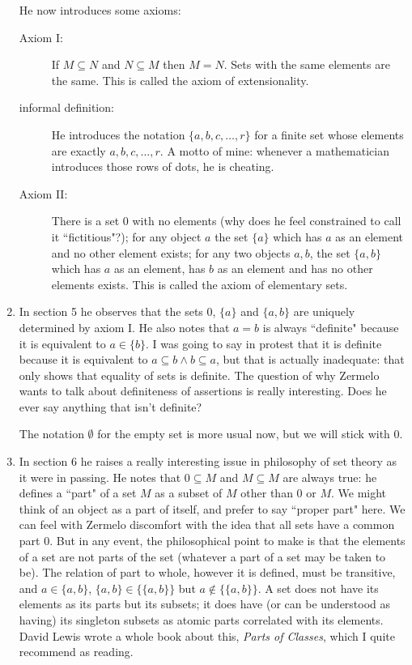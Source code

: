 \documentclass[12pt]{article}
\begin{document}
\begin{enumerate}
He now introduces some axioms:

\begin{description}

\item[Axiom I:]  If $M \subseteq N$ and $N \subseteq M$ then $M=N$.  Sets with the same elements are the same.  This is called the axiom of extensionality.

\item[informal definition:]  He introduces the notation $\{a,b,c,\ldots,r\}$ for a finite set whose elements are exactly $a,b,c,\ldots,r$.  A motto of mine:  whenever a mathematician introduces those rows of dots, he is cheating.

\item[Axiom II:]  There is a set 0 with no elements (why does he feel constrained to call it ``fictitious"?);  for any object $a$ the set $\{a\}$ which has $a$ as an element and no other element exists;  for any two objects $a,b$, the set $\{a,b\}$ which has $a$ as an element, has $b$ as an element and has no other elements exists.  This is called the axiom of elementary sets.

\end{description}

\item In section 5 he observes that the sets 0, $\{a\}$ and $\{a,b\}$ are uniquely determined by axiom I.  He also notes that $a=b$ is always ``definite" because it is equivalent to
$a \in \{b\}$.  I was going to say in protest that it is definite because it is equivalent to $a \subseteq b \wedge b \subseteq a$, but that is actually inadequate:  that only shows that equality of sets is definite.  The question of why Zermelo wants to talk about definiteness of assertions is really interesting.  Does he ever say anything that isn't definite?

The notation $\emptyset$ for the empty set is more usual now, but we will stick with 0.

\item In section 6 he raises a really interesting issue in philosophy of set theory as it were in passing.  He notes that $0 \subseteq M$ and $M \subseteq M$ are always true:  he defines a ``part" of a set $M$ as a subset of $M$ other than 0 or $M$.  We might think of an object as a part of itself, and prefer to say ``proper part" here.  We can feel with Zermelo discomfort with the idea that all sets have a common part 0.  But in any event, the philosophical point to make is that the elements of a set are not parts of the set (whatever a part of a set may be taken to be).  The relation of part to whole, however it is defined, must be transitive, and $a \in \{a,b\}$, $\{a,b\} \in \{\{a,b\}\}$ but $a \not\in \{\{a,b\}\}$.  A set does not have its elements as its parts but its subsets;  it does have (or can be understood as having) its singleton subsets as atomic parts correlated with its elements.  David Lewis wrote a whole book about this, {\em Parts of Classes\/}, which I quite recommend as reading.


\end{enumerate}
\end{document}
